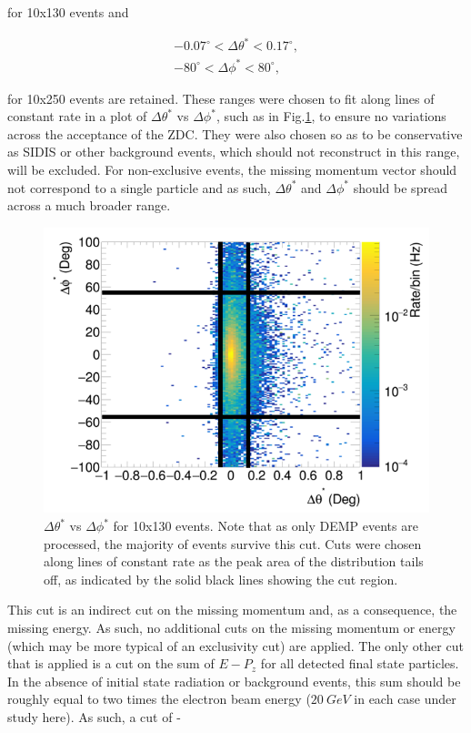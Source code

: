 \documentclass[letterpaper,12pt]{article}
\begin{document}
for 10x130 events and

\begin{gather*}
    -0.07^{\circ} < \Delta\theta^{*} < 0.17^{\circ},\\
    -80^{\circ}< \Delta\phi^{*} < 80^{\circ},
\end{gather*}

for 10x250 events are retained. These ranges were chosen to fit along lines of constant rate in a plot of $\Delta\theta^{*}$ vs $\Delta\phi^{*}$, such as in Fig.\ref{fig:10x130_DeltaCut}, to ensure no variations across the acceptance of the ZDC. They were also chosen so as to be conservative as SIDIS or other background events, which should not reconstruct in this range, will be excluded. For non-exclusive events, the missing momentum vector should not correspond to a single particle and as such, $\Delta\theta^{*}$ and $\Delta\phi^{*}$ should be spread across a much broader range.

\begin{figure}[h]
    \centering
    \includegraphics[width=\textwidth]{Figures/10x130_deltaTheta_deltaPhi_Cut.png}
    \caption{$\Delta\theta^{*}$ vs $\Delta\phi^{*}$ for 10x130 events. Note that as only DEMP events are processed, the majority of events survive this cut. Cuts were chosen along lines of constant rate as the peak area of the distribution tails off, as indicated by the solid black lines showing the cut region.}
\label{fig:10x130_DeltaCut}
\end{figure}

This cut is an indirect cut on the missing momentum and, as a consequence, the missing energy. As such, no additional cuts on the missing momentum or energy (which may be more typical of an exclusivity cut) are applied. The only other cut that is applied is a cut on the sum of $E-P_{z}$ for all detected final state particles. In the absence of initial state radiation or background events, this sum should be roughly equal to two times the electron beam energy ($20~GeV$ in each case under study here). As such, a cut of -
\end{document}
